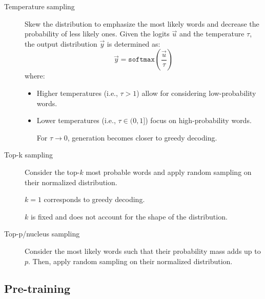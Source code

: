 \begin{description}
\begin{description}
            \item[Temperature sampling]
                Skew the distribution to emphasize the most likely words and decrease the probability of less likely ones. Given the logits $\vec{u}$ and the temperature $\tau$, the output distribution $\vec{y}$ is determined as:
                \[ \vec{y} = \texttt{softmax}\left( \frac{\vec{u}}{\tau} \right) \]
                where:
                \begin{itemize}
                    \item Higher temperatures (i.e., $\tau > 1$) allow for considering low-probability words.
                    \item Lower temperatures (i.e., $\tau \in (0, 1]$) focus on high-probability words.
                    \begin{remark}
                        For $\tau \rightarrow 0$, generation becomes closer to greedy decoding.
                    \end{remark}
                \end{itemize}


            \item[Top-k sampling]
                Consider the top-$k$ most probable words and apply random sampling on their normalized distribution.

                \begin{remark}
                    $k=1$ corresponds to greedy decoding.
                \end{remark}

                \begin{remark}
                    $k$ is fixed and does not account for the shape of the distribution.
                \end{remark}

            \item[Top-p/nucleus sampling]
                Consider the most likely words such that their probability mass adds up to $p$. Then, apply random sampling on their normalized distribution.
        \end{description}
\end{description}


\subsection{Pre-training}


